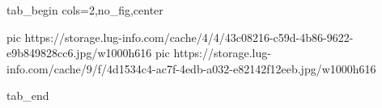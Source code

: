  
 
 
 
 

\ifcmt
  tab_begin cols=2,no_fig,center

     pic https://storage.lug-info.com/cache/4/4/43c08216-c59d-4b86-9622-e9b849828cc6.jpg/w1000h616%
		 pic https://storage.lug-info.com/cache/9/f/4d1534c4-ac7f-4edb-a032-e82142f12eeb.jpg/w1000h616%

  tab_end
\fi
